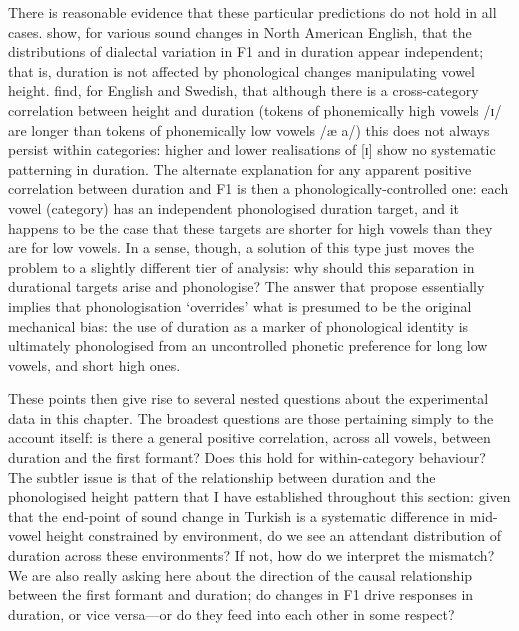 There is reasonable evidence that these particular predictions do not hold in all cases. \citet{Tauberer2009} show, for various sound changes in North American English, that the distributions of dialectal variation in F1 and in duration appear independent; that is, duration is not affected by phonological changes manipulating vowel height. \cite{Toivonen2015} find, for English and Swedish, that although there is a cross-category correlation between height and duration (tokens of phonemically high vowels /ɪ/ are longer than tokens of phonemically low vowels /æ a/) this does not always persist within categories: higher and lower realisations of [ɪ] show no systematic patterning in duration. The alternate explanation for any apparent positive correlation between duration and F1 is then a phonologically-controlled one: each vowel (category) has an independent phonologised duration target, and it happens to be the case that these targets are shorter for high vowels than they are for low vowels. In a sense, though, a solution of this type just moves the problem to a slightly different tier of analysis: why should this separation in durational targets arise and phonologise? The answer that \citet{Sole2010} propose essentially implies that phonologisation `overrides' what is presumed to be the original mechanical bias: the use of duration as a marker of phonological identity is ultimately phonologised from an uncontrolled phonetic preference for long low vowels, and short high ones.

These points then give rise to several nested questions about the experimental data in this chapter. The broadest questions are those pertaining simply to the account itself: is there a general positive correlation, across all vowels, between duration and the first formant? Does this hold for within-category behaviour? The subtler issue is that of the relationship between duration and the phonologised height pattern that I have established throughout this section: given that the end-point of sound change in Turkish is a systematic difference in mid-vowel height constrained by environment, do we see an attendant distribution of duration across these environments? If not, how do we interpret the mismatch? We are also really asking here about the direction of the causal relationship between the first formant and duration; do changes in F1 drive responses in duration, or vice versa---or do they feed into each other in some respect?

